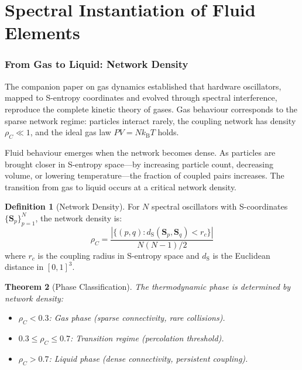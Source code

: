 \documentclass[twocolumn,10pt,a4paper]{article}
\theoremstyle{plain}
\newtheorem{theorem}{Theorem}[section]
\theoremstyle{definition}
\newtheorem{definition}[theorem]{Definition}
\theoremstyle{remark}
\newcommand{\kB}{k_{\mathrm{B}}}
\newcommand{\Scoord}{\mathbf{S}}
\newcommand{\dS}{d_{\mathrm{S}}}
\begin{document}
\begin{abstract}
\medskip
\noindent\textbf{Keywords:} spectral-native dynamics, partition network, viscosity, Navier--Stokes, partition lag, coupling strength, phase-lock network, S-entropy coordinates, ray marching, light derivation, triple observation, Doppler retention, GPU shader pipeline, fluid dynamics, phase transition
\end{abstract}


\part{Spectral Instantiation of Fluid Elements}
\label{part:instantiation}

\section{From Gas to Liquid: Network Density}
\label{sec:network_density}

The companion paper on gas dynamics established that hardware oscillators, mapped to S-entropy coordinates and evolved through spectral interference, reproduce the complete kinetic theory of gases. Gas behaviour corresponds to the sparse network regime: particles interact rarely, the coupling network has density $\rho_C \ll 1$, and the ideal gas law $PV = N\kB T$ holds.

Fluid behaviour emerges when the network becomes dense. As particles are brought closer in S-entropy space---by increasing particle count, decreasing volume, or lowering temperature---the fraction of coupled pairs increases. The transition from gas to liquid occurs at a critical network density.

\begin{definition}[Network Density]
\label{def:network_density}
For $N$ spectral oscillators with S-coordinates $\{\Scoord_p\}_{p=1}^{N}$, the network density is:
\begin{equation}
    \rho_C = \frac{|\{(p,q) : \dS(\Scoord_p, \Scoord_q) < r_c\}|}{N(N-1)/2}
\end{equation}
where $r_c$ is the coupling radius in S-entropy space and $\dS$ is the Euclidean distance in $[0,1]^3$.
\end{definition}

\begin{theorem}[Phase Classification]
\label{thm:phase}
The thermodynamic phase is determined by network density:
\begin{itemize}
    \item $\rho_C < 0.3$: Gas phase (sparse connectivity, rare collisions).
    \item $0.3 \leq \rho_C \leq 0.7$: Transition regime (percolation threshold).
    \item $\rho_C > 0.7$: Liquid phase (dense connectivity, persistent coupling).
\end{itemize}
\end{theorem}
\end{document}
